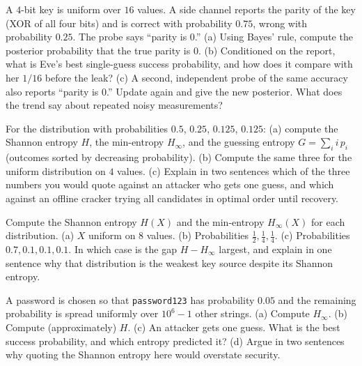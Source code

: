 \begin{exercise}
\label{ch07:ex-bayes}
A $4$-bit key is uniform over $16$ values. A side channel reports the parity of the key (XOR of all four bits) and is correct with probability $0.75$, wrong with probability $0.25$. The probe says ``parity is $0$.'' (a) Using Bayes' rule, compute the posterior probability that the true parity is $0$. (b) Conditioned on the report, what is Eve's best single-guess success probability, and how does it compare with her $1/16$ before the leak? (c) A second, independent probe of the same accuracy also reports ``parity is $0$.'' Update again and give the new posterior. What does the trend say about repeated noisy measurements?
\end{exercise}

\begin{exercise}
\label{ch07:ex-guesswork}
For the distribution with probabilities $0.5$, $0.25$, $0.125$, $0.125$: (a) compute the Shannon entropy $H$, the min-entropy $H_\infty$, and the guessing entropy $G = \sum_i i\,p_i$ (outcomes sorted by decreasing probability). (b) Compute the same three for the uniform distribution on $4$ values. (c) Explain in two sentences which of the three numbers you would quote against an attacker who gets one guess, and which against an offline cracker trying all candidates in optimal order until recovery.
\end{exercise}

\begin{exercise}
\label{ch07:ex-entropy}
Compute the Shannon entropy $H(X)$ and the min-entropy $H_\infty(X)$ for each distribution. (a) $X$ uniform on $8$ values. (b) Probabilities $\frac{1}{2}, \frac{1}{4}, \frac{1}{4}$. (c) Probabilities $0.7, 0.1, 0.1, 0.1$. In which case is the gap $H - H_\infty$ largest, and explain in one sentence why that distribution is the weakest key source despite its Shannon entropy.
\end{exercise}

\begin{exercise}
\label{ch07:ex-minent-bound}
A password is chosen so that \texttt{password123} has probability $0.05$ and the remaining probability is spread uniformly over $10^{6} - 1$ other strings. (a) Compute $H_\infty$. (b) Compute (approximately) $H$. (c) An attacker gets one guess. What is the best success probability, and which entropy predicted it? (d) Argue in two sentences why quoting the Shannon entropy here would overstate security.
\end{exercise}

